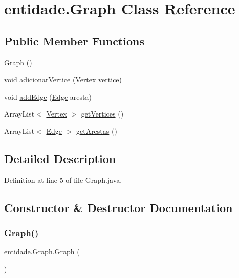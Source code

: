\hypertarget{classentidade_1_1Graph}{}\section{entidade.\+Graph Class Reference}
\label{classentidade_1_1Graph}
\subsection*{Public Member Functions}
\begin{DoxyCompactItemize}
\item 
\hyperlink{classentidade_1_1Graph_a8198c0f5c431837a3703d1473ab226ee}{Graph} ()
\item 
void \hyperlink{classentidade_1_1Graph_a95cb77104c1025c3628f614a299421ab}{adicionar\+Vertice} (\hyperlink{classentidade_1_1Vertex}{Vertex} vertice)
\item 
void \hyperlink{classentidade_1_1Graph_a284be62e0044149ea34122fabcdf1ace}{add\+Edge} (\hyperlink{classentidade_1_1Edge}{Edge} aresta)
\item 
Array\+List$<$ \hyperlink{classentidade_1_1Vertex}{Vertex} $>$ \hyperlink{classentidade_1_1Graph_a680550908cc41c83b901fb795cbbfd47}{get\+Vertices} ()
\item 
Array\+List$<$ \hyperlink{classentidade_1_1Edge}{Edge} $>$ \hyperlink{classentidade_1_1Graph_a36fc05f2c89421c63f9538bf280e54bb}{get\+Arestas} ()
\end{DoxyCompactItemize}


\subsection{Detailed Description}


Definition at line 5 of file Graph.\+java.



\subsection{Constructor \& Destructor Documentation}
\hypertarget{classentidade_1_1Graph_a8198c0f5c431837a3703d1473ab226ee}{}\label{classentidade_1_1Graph_a8198c0f5c431837a3703d1473ab226ee} 
\subsubsection{\texorpdfstring{Graph()}{Graph()}}
{\footnotesize\ttfamily entidade.\+Graph.\+Graph (\begin{DoxyParamCaption}{ }\end{DoxyParamCaption})}



